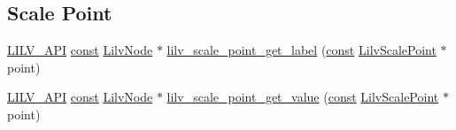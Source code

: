 \subsection*{Scale Point}
\begin{DoxyCompactItemize}
\item 
\hyperlink{lilv_8h_aa5182eee7ddff96862d0171967ee6f77}{L\+I\+L\+V\+\_\+\+A\+PI} \hyperlink{getopt1_8c_a2c212835823e3c54a8ab6d95c652660e}{const} \hyperlink{lilv_8h_ae183dca3dca5368d34dbd863a405437b}{Lilv\+Node} $\ast$ \hyperlink{group__lilv_gacf72c12ce63b1904a3027552515c226b}{lilv\+\_\+scale\+\_\+point\+\_\+get\+\_\+label} (\hyperlink{getopt1_8c_a2c212835823e3c54a8ab6d95c652660e}{const} \hyperlink{lilv_8h_a582b8861d7e51d38ff769281ef4ae518}{Lilv\+Scale\+Point} $\ast$point)
\item 
\hyperlink{lilv_8h_aa5182eee7ddff96862d0171967ee6f77}{L\+I\+L\+V\+\_\+\+A\+PI} \hyperlink{getopt1_8c_a2c212835823e3c54a8ab6d95c652660e}{const} \hyperlink{lilv_8h_ae183dca3dca5368d34dbd863a405437b}{Lilv\+Node} $\ast$ \hyperlink{group__lilv_gaf64223c52368882fa3121ff369b19126}{lilv\+\_\+scale\+\_\+point\+\_\+get\+\_\+value} (\hyperlink{getopt1_8c_a2c212835823e3c54a8ab6d95c652660e}{const} \hyperlink{lilv_8h_a582b8861d7e51d38ff769281ef4ae518}{Lilv\+Scale\+Point} $\ast$point)
\end{DoxyCompactItemize}
